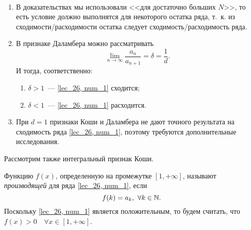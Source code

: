 \documentclass[../../main.tex]{subfiles}
\begin{document}
	\begin{remarks}
	
	~
	
	\begin{enumerate}
	\item В доказательствах мы использовали <<для достаточно больших $N$>>, 
	то есть условие должно выполнятся для некоторого остатка ряда, т.~к. из 
	сходимости/расходимости остатка следует сходимость/расходимость ряда.
	\item  В признаке Даламбера можно рассматривать
		\[  \lim_{n \to \infty} \frac{a_n}{a_{n+1}} = \delta = \frac{1}{d}. \]
		И тогда, соответственно:
		\begin{enumerate}[label={\alph*)}]
		\item $\delta > 1$~--- \eqref{lec_26, 
		num_1} сходится; \\
		\item $\delta < 1$~--- \eqref{lec_26, 
		num_1} расходится.
		\end{enumerate}
		
	\item При $d=1$ признаки Коши и Даламбера не дают точного результата 
	на сходимость ряда \eqref{lec_26, num_1}, поэтому требуются дополнительные 
	исследования.
	\end{enumerate}
	\end{remarks}
	
	Рассмотрим также интегральный признак Коши.
	
	Функцию $f(x)$, определенную на промежутке $[1, + \infty]$, называют 
		\emph{производящей} для ряда \eqref{lec_26, num_1}, если
		\[ f(k) = a_k, \ \forall k \in \mathbb{N}.\]
		Поскольку \eqref{lec_26, num_1} является положительным, то будем считать, что
		$f(x) > 0 \quad \forall x \in 
		[1, + \infty]$.
	
\end{document}
